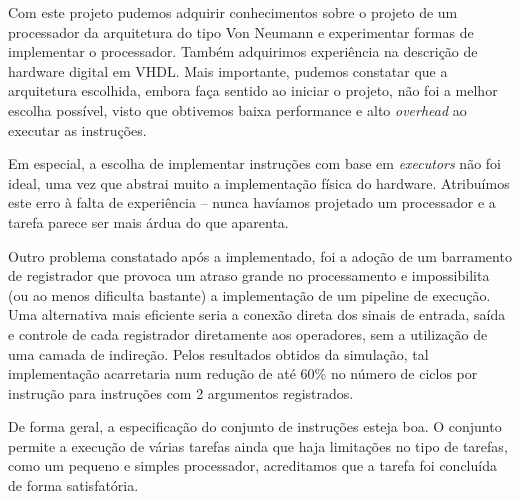 \documentclass[11pt]{report}
\begin{document}
Com este projeto pudemos adquirir conhecimentos sobre o projeto de um processador da arquitetura do tipo Von Neumann e experimentar formas de implementar o processador. Também adquirimos experiência na descrição de hardware digital em VHDL. Mais importante, pudemos constatar que a arquitetura escolhida, embora faça sentido ao iniciar o projeto, não foi a melhor escolha possível, visto que obtivemos baixa performance e alto \emph{overhead} ao executar as instruções.

Em especial, a escolha de implementar instruções com base em \emph{executors} não foi ideal, uma vez que abstrai muito a implementação física do hardware. Atribuímos este erro à falta de experiência -- nunca havíamos projetado um processador e a tarefa parece ser mais árdua do que aparenta.

Outro problema constatado após a implementado, foi a adoção de um barramento de registrador que provoca um atraso grande no processamento e impossibilita (ou ao menos dificulta bastante) a implementação de um pipeline de execução. Uma alternativa mais eficiente seria a conexão direta dos sinais de entrada, saída e controle de cada registrador diretamente aos operadores, sem a utilização de uma camada de indireção. Pelos resultados obtidos da simulação, tal implementação acarretaria num redução de até 60\% no número de ciclos por instrução para instruções com 2 argumentos registrados.

De forma geral, a especificação do conjunto de instruções esteja boa. O conjunto permite a execução de várias tarefas ainda que haja limitações no tipo de tarefas, como um pequeno e simples processador, acreditamos que a tarefa foi concluída de forma satisfatória.
\end{document}
